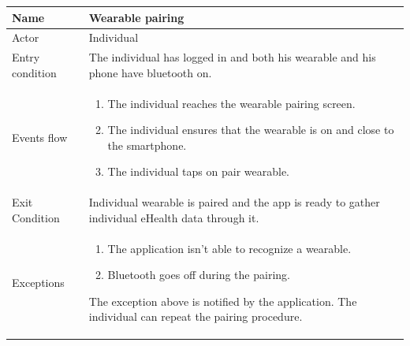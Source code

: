 \begin{tabular}{|l|p{11cm}|}
    \hline
    Name & Wearable pairing
    \\ \hline
    Actor & Individual
    \\ \hline 
    Entry condition & The individual has logged in and both his wearable and his phone have bluetooth on.
    \\ \hline
    Events flow &
    \begin{enumerate}
    \item The individual reaches the wearable pairing screen.
    \item The individual ensures that the wearable is on and close to the smartphone.
    \item The individual taps on pair wearable.
    \end{enumerate}
     \\ \hline
     Exit Condition & Individual wearable is paired and the app is ready to gather individual eHealth data through it.
     \\
    \hline
    Exceptions &
        \begin{enumerate}
    \item The application isn't able to recognize a wearable. 
   	\item Bluetooth goes off during the pairing.
    \end{enumerate}
    The exception above is notified by the application. The individual can repeat the pairing procedure.
      \\
    \hline

\end{tabular}

\givespace

